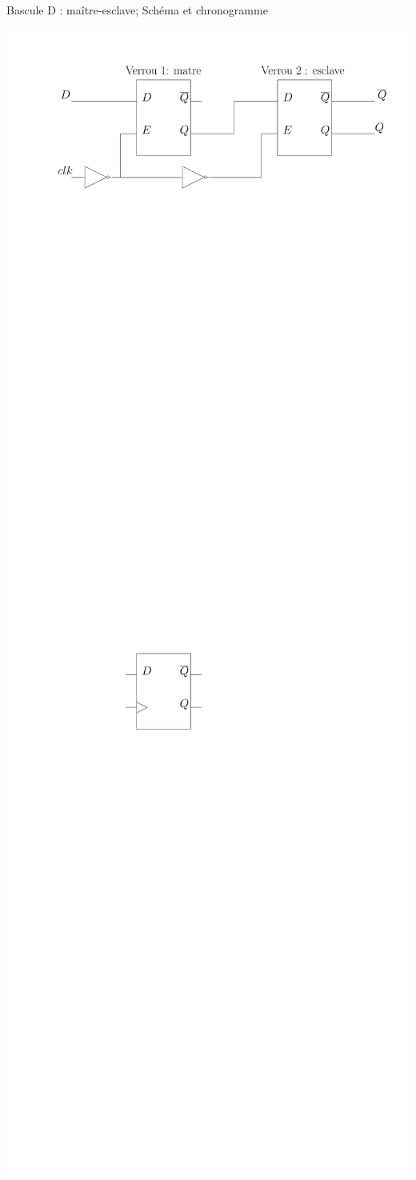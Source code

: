 \documentclass{beamer}
\begin{document}
\begin{frame}
\begin{block}{Bascule D : maître-esclave; Schéma et chronogramme}
\begin{minipage}[c]{0.4\linewidth}
\centering\includegraphics[width=\columnwidth]{Figs/flipflop_D.pdf}\\
\centering\includegraphics[width=0.3\columnwidth]{Figs/flipflop_D_schema.pdf}
\end{minipage}
\hspace{0.3cm}

\end{block}
\end{frame}
\end{document}
